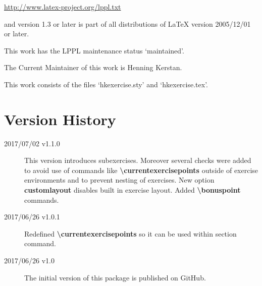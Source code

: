 \documentclass[
  twocolumn,%
  fontsize=9pt,%
  DIV=calc,%
  numbers=noendperiod%
]{scrartcl}
\begin{document}
   \url{http://www.latex-project.org/lppl.txt}\medskip

\noindent and version 1.3 or later is part of all distributions of LaTeX version 2005/12/01 or later.\medskip

\noindent This work has the LPPL maintenance status `maintained'.\medskip

\noindent The Current Maintainer of this work is Henning Kerstan.\medskip

\noindent This work consists of the files `hkexercise.sty' and `hkexercise.tex'.


\section{Version History}
\begin{description}
\item[2017/07/02 v1.1.0] This version introduces subexercises. Moreover several checks were added to avoid use of commands like \textcolor{NavyBlue}{\ttfamily\bfseries\textbackslash currentexercisepoints} outside of exercise environments and to prevent nesting of exercises. New option \textcolor{NavyBlue}{\ttfamily\bfseries customlayout} disables built in exercise layout. Added \textcolor{NavyBlue}{\ttfamily\bfseries\textbackslash bonuspoint} commands.
\item[2017/06/26 v1.0.1] Redefined \textcolor{NavyBlue}{\ttfamily\bfseries\textbackslash currentexercisepoints} so it can be used within section command. 
\item[2017/06/26 v1.0] The initial version of this package is published on GitHub.
\end{description}
\end{document}
